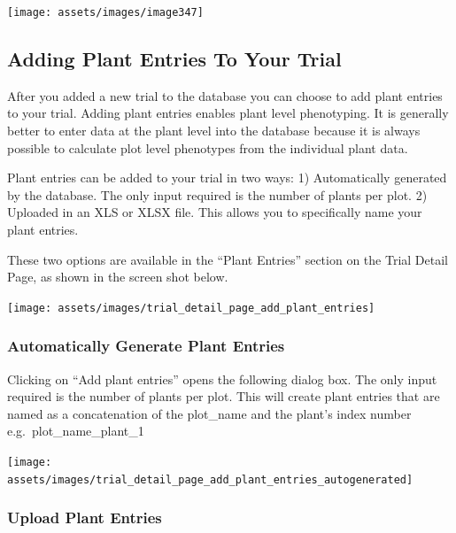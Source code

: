 \documentclass[
  12pt,
]{book}
\begin{document}
\begin{center}\texttt{[image: assets/images/image347]} \end{center}

\hypertarget{adding-plant-entries-to-your-trial}{%
\subsection{Adding Plant Entries To Your Trial}\label{adding-plant-entries-to-your-trial}}

After you added a new trial to the database you can choose to add plant entries to your trial. Adding plant entries enables plant level phenotyping. It is generally better to enter data at the plant level into the database because it is always possible to calculate plot level phenotypes from the individual plant data.

Plant entries can be added to your trial in two ways: 1) Automatically generated by the database. The only input required is the number of plants per plot. 2) Uploaded in an XLS or XLSX file. This allows you to specifically name your plant entries.

These two options are available in the ``Plant Entries'' section on the Trial Detail Page, as shown in the screen shot below.

\begin{center}\texttt{[image: assets/images/trial\_detail\_page\_add\_plant\_entries]} \end{center}

\hypertarget{automatically-generate-plant-entries}{%
\subsubsection*{Automatically Generate Plant Entries}\label{automatically-generate-plant-entries}}


Clicking on ``Add plant entries'' opens the following dialog box. The only input required is the number of plants per plot. This will create plant entries that are named as a concatenation of the plot\_name and the plant's index number e.g.~plot\_name\_plant\_1

\begin{center}\texttt{[image: assets/images/trial\_detail\_page\_add\_plant\_entries\_autogenerated]} \end{center}

\hypertarget{upload-plant-entries}{%
\subsubsection*{Upload Plant Entries}\label{upload-plant-entries}}
\end{document}
